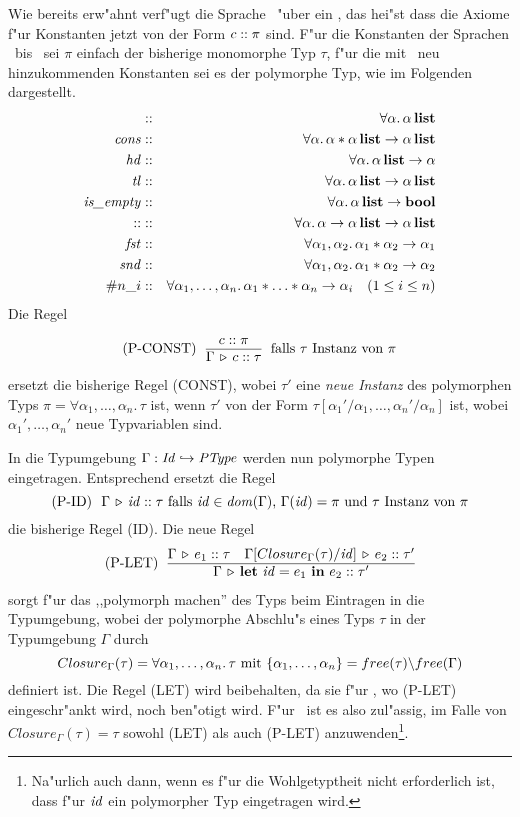 Wie bereits erw"ahnt verf"ugt die Sprache \LTHREE\ "uber ein , das hei"st dass die Axiome f"ur
Konstanten jetzt von der Form $c\mathrel{::}\pi$ sind. F"ur die Konstanten der Sprachen \LONE\ bis \LTWO\ sei $\pi$
einfach der bisherige monomorphe Typ $\tau$, f"ur die mit \LTHREE\ neu hinzukommenden Konstanten sei es der
polymorphe Typ, wie im Folgenden dargestellt.
\begin{eqnarray*}
 [\,]         & :: & \forall\alpha.\,\ltype{\alpha} \\
\Cons         & :: & \forall\alpha.\,\alpha * \ltype{\alpha}\to \ltype{\alpha}\\
  \Hd         & :: & \forall\alpha.\,\ltype{\alpha} \to \alpha \\
  \Tl         & :: & \forall\alpha.\,\ltype{\alpha} \to \ltype{\alpha}\\
\Empty        & :: & \forall\alpha.\,\ltype{\alpha} \to \bool\\
 \coloncolon  & :: & \forall\alpha.\,\alpha \to \ltype{\alpha} \to \ltype{\alpha}\\
 \Fst         & :: & \forall\alpha_1,\alpha_2.\,\alpha_1 * \alpha_2 \to \alpha_1\\
 \Snd         & :: & \forall\alpha_1,\alpha_2.\,\alpha_1 * \alpha_2 \to \alpha_2\\
 \#n\_i       & :: & \forall\alpha_1,\ldots,\alpha_n.\,\alpha_1 * \ldots * \alpha_n \to \alpha_i \quad (1 \le i \le n)
\end{eqnarray*}
Die Regel
\[ \mbox{(P-CONST) }\ \regel{\tj{c}{\pi}}
                            {\Tj{\Gamma}{c}{\tau}}
   \ \mbox{ falls $\tau$ Instanz von $\pi$}\]
ersetzt die bisherige Regel (CONST), wobei $\tau'$ eine \emph{neue Instanz} des polymorphen Typs
$\pi = \forall\alpha_1,\ldots,\alpha_n.\,\tau$ ist, wenn $\tau'$ von der Form $\tau[\alpha_1'/\alpha_1,\ldots,\alpha_n'/\alpha_n]$
ist, wobei $\alpha_1',\ldots,\alpha_n'$ neue Typvariablen sind.

In die Typumgebung $\Gamma: {\text{\it Id\/}} \hookrightarrow {\text{\it PType\/}}$ werden nun polymorphe Typen eingetragen. Entsprechend ersetzt die Regel
\[ \mbox{(P-ID) }\ \Tj{\Gamma}{\id}{\tau} \reason{falls $\id \in \dom \Gamma$, $\Gamma(\id) = \pi$ und $\tau$ Instanz von $\pi$} \]
die bisherige Regel (ID). Die neue Regel
\[ \mbox{(P-LET) }\ \regel{\Tj{\Gamma}{e_1}{\tau}
                          \quad
                          \Tj{\Gamma[Closure_\Gamma(\tau)/\id]}{e_2}{\tau'}}
                          {\Tj{\Gamma}{\bli{\id}{e_1}{e_2}}{\tau'}}\]
sorgt f"ur das ,,polymorph machen'' des Typs beim Eintragen in die Typumgebung, wobei der polymorphe Abschlu"s eines Typs $\tau$
in der Typumgebung $\Gamma$ durch
\[
  Closure_\Gamma(\tau) = \forall\alpha_1,\ldots,\alpha_n.\,\tau \ \mbox{mit $\{\alpha_1,\ldots,\alpha_n\} = free(\tau) \backslash free(\Gamma)$}
\]
definiert ist. Die Regel (LET) wird beibehalten, da sie f"ur \LFOUR, wo (P-LET) eingeschr"ankt wird, noch ben"otigt wird. F"ur \LTHREE\ ist
es also zul"assig, im Falle von $Closure_\Gamma(\tau) = \tau$ sowohl (LET) als auch (P-LET) anzuwenden\footnote{Na"urlich auch dann, wenn
es f"ur die Wohlgetyptheit nicht erforderlich ist, dass f"ur ${\text{\it id\/}}$ ein polymorpher Typ eingetragen wird.}.

